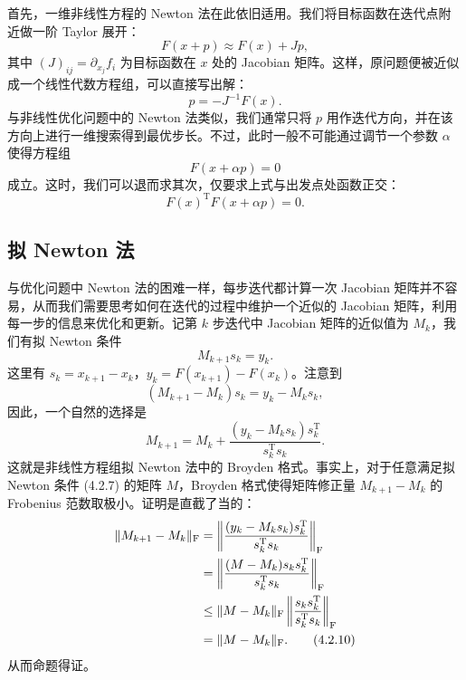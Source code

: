 首先，一维非线性方程的 Newton 法在此依旧适用。我们将目标函数在迭代点附近做一阶 Taylor 展开：
\begin{equation}
F(x+p)\approx F(x)+Jp,
\tag{4.2.3}
\end{equation}
其中 $(J)_{ij}=\partial_{x_j}f_i$ 为目标函数在 $x$ 处的 Jacobian 矩阵。这样，原问题便被近似成一个线性代数方程组，可以直接写出解：
\begin{equation}
p=-J^{-1}F(x).
\tag{4.2.4}
\end{equation}
与非线性优化问题中的 Newton 法类似，我们通常只将 $p$ 用作迭代方向，并在该方向上进行一维搜索得到最优步长。不过，此时一般不可能通过调节一个参数 $\alpha$ 使得方程组
\begin{equation}
F(x+\alpha p)=0
\tag{4.2.5}
\end{equation}
成立。这时，我们可以退而求其次，仅要求上式与出发点处函数正交：
\begin{equation}
F(x)^{\mathrm T}F(x+\alpha p)=0.
\tag{4.2.6}
\end{equation}

\subsection{拟 Newton 法}

与优化问题中 Newton 法的困难一样，每步迭代都计算一次 Jacobian 矩阵并不容易，从而我们需要思考如何在迭代的过程中维护一个近似的 Jacobian 矩阵，利用每一步的信息来优化和更新。记第 $k$ 步迭代中 Jacobian 矩阵的近似值为 $M_k$，我们有拟 Newton 条件
\begin{equation}
M_{k+1}s_k=y_k.
\tag{4.2.7}
\end{equation}
这里有 $s_k=x_{k+1}-x_k$，$y_k=F(x_{k+1})-F(x_k)$。注意到
\begin{equation}
(M_{k+1}-M_k)s_k=y_k-M_k s_k,
\tag{4.2.8}
\end{equation}
因此，一个自然的选择是
\begin{equation}
M_{k+1}=M_k+\frac{(y_k-M_k s_k)s_k^{\mathrm T}}{s_k^{\mathrm T}s_k}.
\tag{4.2.9}
\end{equation}
这就是非线性方程组拟 Newton 法中的 Broyden 格式。事实上，对于任意满足拟 Newton 条件 (4.2.7) 的矩阵 $M$，Broyden 格式使得矩阵修正量 $M_{k+1}-M_k$ 的 Frobenius 范数取极小。证明是直截了当的：
\begin{align}
\|M_{k+1}-M_k\|_{\mathrm F}
&=\left\|\frac{(y_k-M_k s_k)s_k^{\mathrm T}}{s_k^{\mathrm T}s_k}\right\|_{\mathrm F}\notag\\
&=\left\|\frac{(M-M_k)s_k s_k^{\mathrm T}}{s_k^{\mathrm T}s_k}\right\|_{\mathrm F}\notag\\
&\le \|M-M_k\|_{\mathrm F}\left\|\frac{s_k s_k^{\mathrm T}}{s_k^{\mathrm T}s_k}\right\|_{\mathrm F}\notag\\
&=\|M-M_k\|_{\mathrm F}.
\tag{4.2.10}
\end{align}
从而命题得证。

